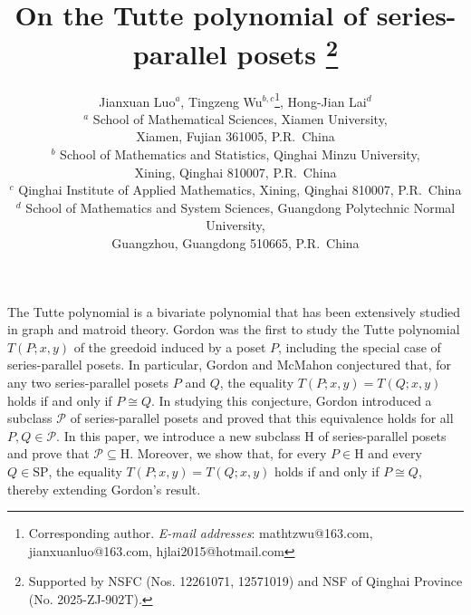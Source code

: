 \documentclass[11pt,a4paper]{article}
\begin{document}
\title
{\LARGE \textbf{On the Tutte polynomial of series-parallel posets
\thanks{Supported by NSFC (Nos. 12261071,  12571019) and NSF of Qinghai Province (No. 2025-ZJ-902T).} }}

\author{Jianxuan Luo$^a$, Tingzeng Wu$^{b,c}$\thanks{{Corresponding author.\newline
\emph{E-mail addresses}: mathtzwu@163.com, jianxuanluo@163.com, hjlai2015@hotmail.com
}}, Hong-Jian Lai$^{d}$ \\
{\small $^{a}$ School of Mathematical Sciences, Xiamen University,}\\
{\small  Xiamen, Fujian 361005,  P.R.~China} \\
{\small $^{b}$ School of Mathematics and Statistics, Qinghai Minzu University, }\\
{\small  Xining, Qinghai 810007, P.R.~China} \\
{\small $^{c}$ Qinghai Institute of Applied Mathematics, Xining, Qinghai 810007, P.R.~China}\\
{\small $^{d}$ School of Mathematics and System Sciences, Guangdong Polytechnic Normal University,}\\
{\small  Guangzhou, Guangdong 510665, P.R.~China}}
\date{}

\maketitle
{}
The Tutte polynomial is a bivariate polynomial that has been extensively studied in graph and matroid theory.
Gordon was the first to study the Tutte polynomial $T(P;x,y)$ of the greedoid induced by a poset $P$, 
including the special case of series-parallel posets.
In particular, Gordon and McMahon conjectured that, for any two series-parallel posets $P$ and $Q$, the equality $T(P;x,y)=T(Q;x,y)$ holds if and only if $P\cong Q$.
In studying this conjecture, Gordon introduced a subclass $\mathcal{P}$ of series-parallel posets and proved that this equivalence holds for all $P,Q\in\mathcal{P}$.
In this paper, we introduce a new subclass $\mathrm H$ of series-parallel posets and prove that $\mathcal P\subseteq\mathrm H$.
Moreover, we show that, for every $P\in\mathrm H$ and every $Q\in\mathrm{SP}$, the equality $T(P;x,y)=T(Q;x,y)$ holds if and only if $P\cong Q$,
thereby extending Gordon's result.
\end{document}
